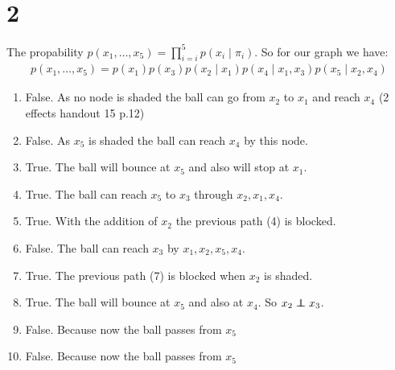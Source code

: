 \section*{2}
The propability $p(x_1,\dotsc,x_5) = \prod_{i=i}^5 p(x_i\mid \pi_i)$.
So for our graph we have:
\begin{align*}
p(x_1,\dotsc,x_5) = p(x_1)p(x_3)p(x_2\mid x_1)p(x_4\mid x_{1},x_3)p(x_5\mid x_{2},x_4)
\end{align*}
\begin{enumerate}
\item False. As no node is shaded the ball can go from $x_2$ to $x_1$ and reach $x_4$ (2 effects handout 15 p.12)
\item False. As $x_5$ is shaded the ball can reach $x_4$ by this node.
\item True. The ball will bounce at $x_5$ and also will stop at $x_1$.
\item True. The ball can reach $x_5$ to $x_3$ through $x_2, x_1, x_4$.
\item True. With the addition of $x_2$ the previous path (4) is blocked.
\item False. The ball can reach $x_3$ by $x_1, x_2, x_5, x_4$.
\item True. The previous path (7) is blocked when $x_2$ is shaded.
\item True. The ball will bounce at $x_5$ and also at $x_4$. So $x_2 \independent x_3$. 
\item False. Because now the ball passes from $x_5$
\item False. Because now the ball passes from $x_5$
\end{enumerate}
